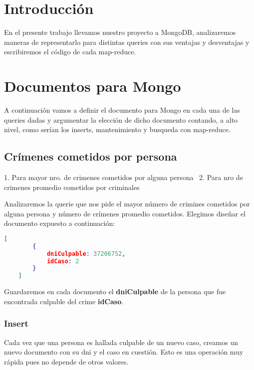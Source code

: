 \documentclass[11pt, a4paper]{article}
\begin{document}

\maketitle
\newpage

\tableofcontents
\newpage

%
\section{Introducción}

En el presente trabajo llevamos nuestro proyecto a MongoDB, analizaremos maneras de representarlo para distintas queries con sus ventajas y desventajas y escribiremos el c\'odigo de cada map-reduce.

\section{Documentos para Mongo}

A continuaci\'on vamos a definir el documento para Mongo en cada una de las queries dadas y argumentar la elecci\'on de dicho documento contando, a alto nivel, como ser\'ian los inserts, mantenimiento y busqueda con map-reduce.

\subsection{Cr\'imenes cometidos por persona}
1. Para mayor nro. de crimenes cometidos por alguna persona \
2. Para nro de crimenes promedio cometidos por criminales \

Analizaremos la querie que nos pide el mayor n\'umero de crimines cometidos por alguna persona y n\'umero de cr\'imenes promedio cometidos. Elegimos diseñar el documento expuesto a continuación: 

\begin{lstlisting}[language=json]
	[
		{
			dniCulpable: 37206752,
			idCaso: 2
		}
	]
\end{lstlisting}

Guardaremos en cada documento el \textbf{dniCulpable} de la persona que fue encontrada culpable del crime \textbf{idCaso}. \

\subsubsection{Insert}

Cada vez que una persona es hallada culpable de un nuevo caso, creamos un nuevo documento con su dni y el caso en cuesti\'on. Esto es una operaci\'on muy r\'apida pues no depende de otros valores.
\end{document}
